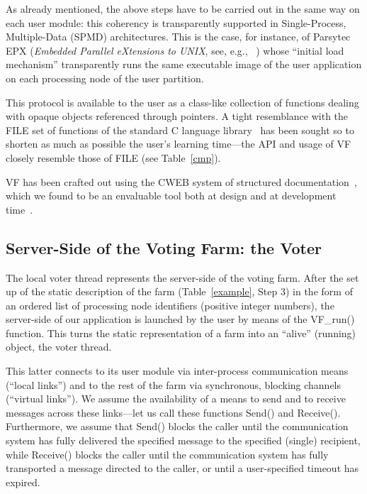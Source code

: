 \documentclass[11pt]{article}
\begin{document}
As already mentioned, the above steps have to be carried out in the 
same way on each user module: this coherency is transparently supported
in Single-Process, Multiple-Data (SPMD) architectures. This is the
case, for instance, of Parsytec EPX
({\em Embedded Parallel eXtensions to UNIX\/}, see, e.g., ~\cite{Pars96b,Pars96a})
whose ``initial load mechanism'' transparently runs the same executable image
of the user application on each processing node of the user partition.

This protocol is available to the user as a class-like collection of
functions dealing with opaque objects referenced through pointers.
A tight resemblance with the {\sf FILE} set of functions of
the standard C language library~\cite{KeRi2} has been sought so to shorten
as much as possible the user's learning time---the
API and usage of VF closely resemble those of {\sf FILE} (see Table~\ref{cmp}).

VF has been crafted out using the CWEB system of structured
documentation~\cite{DeFl97b}, which we found to be an envaluable tool
both at design and at development time~\cite{Knuth92}.


\subsection{Server-Side of the Voting Farm: the Voter}\label{ss}
The local voter thread represents the server-side of the voting farm.
After the set up of the static description of the farm (Table~\ref{example},
Step 3) in the form of an ordered list of processing node identifiers
(positive integer numbers), the server-side of our application
is launched by the user by means of the {\sf VF\_run()} function. 
This turns the static representation of a farm 
into an ``alive'' (running) object, the voter thread.


This latter connects to its user module via inter-process communication
means (``local links'') and to the rest 
of the farm via synchronous, blocking channels (``virtual links'').
We assume the availability of a means to send and to receive messages
across these links---let us call these functions {\sf Send()} and
{\sf Receive()}. Furthermore, we assume that {\sf Send()} blocks
the caller until the communication system has fully delivered the
specified message to the specified (single) recipient, while {\sf Receive()} blocks
the caller until the communication system has fully transported
a message directed to the caller, or until a user-specified timeout has expired.
\end{document}
